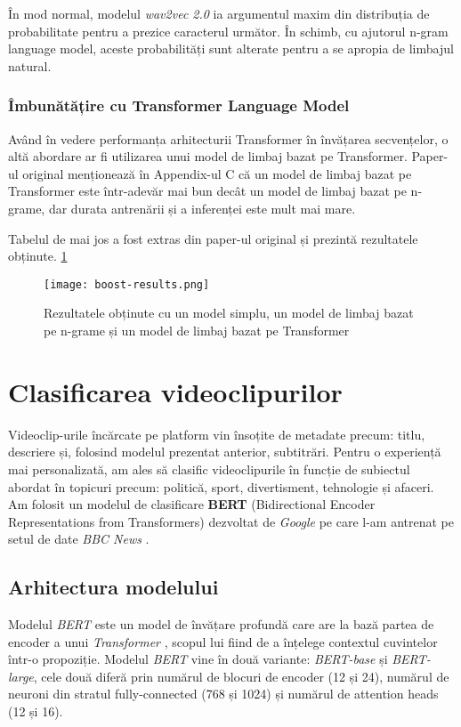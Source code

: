 \par
În mod normal, modelul \textit{wav2vec 2.0} ia argumentul maxim din distribuția de probabilitate
pentru a prezice caracterul următor. În schimb, cu ajutorul n-gram language model, aceste
probabilități sunt alterate pentru a se apropia de limbajul natural. 

\subsubsection{Îmbunătățire cu Transformer Language Model}
\vspace{1em}
Având în vedere performanța arhitecturii Transformer în învățarea secvențelor, o altă abordare
ar fi utilizarea unui model de limbaj bazat pe Transformer. Paper-ul original \cite{wav2vec2}
menționează în Appendix-ul C că un model de limbaj bazat pe Transformer este într-adevăr mai
bun decât un model de limbaj bazat pe n-grame, dar durata antrenării și a inferenței este
mult mai mare. 
\par 
Tabelul de mai jos a fost extras din paper-ul original și prezintă rezultatele obținute. \ref{fig:boost-results}

\begin{figure}[h!]
    \centering
    \texttt{[image: boost-results.png]}
    \caption{Rezultatele obținute cu un model simplu, un model de limbaj bazat pe n-grame și un model de limbaj bazat pe Transformer}
    \label{fig:boost-results}
\end{figure}


\section{Clasificarea videoclipurilor}
\label{sec:clasificare-videoclipuri}
Videoclip-urile încărcate pe platform vin însoțite de metadate precum: titlu, descriere și, folosind
modelul prezentat anterior, subtitrări. Pentru o experiență mai personalizată, am ales să clasific
videoclipurile în funcție de subiectul abordat în topicuri precum: politică, sport, divertisment,
tehnologie și afaceri. Am folosit un modelul de clasificare \textbf{BERT} (Bidirectional Encoder Representations
from Transformers) dezvoltat de \textit{Google} \cite{devlin2019bert} pe care l-am antrenat pe setul de date
\textit{BBC News} \cite{greene06icml}.

\subsection{Arhitectura modelului}
Modelul \textit{BERT} este un model de învățare profundă care are la bază partea de encoder a unui \textit{Transformer} \cite{vaswani2023attention},
scopul lui fiind de a înțelege contextul cuvintelor într-o propoziție. Modelul \textit{BERT} vine în două
variante: \textit{BERT-base} și \textit{BERT-large}, cele două diferă prin numărul de blocuri de encoder (12 și 24),
numărul de neuroni din stratul fully-connected (768 și 1024) și numărul de attention heads (12 și 16).

